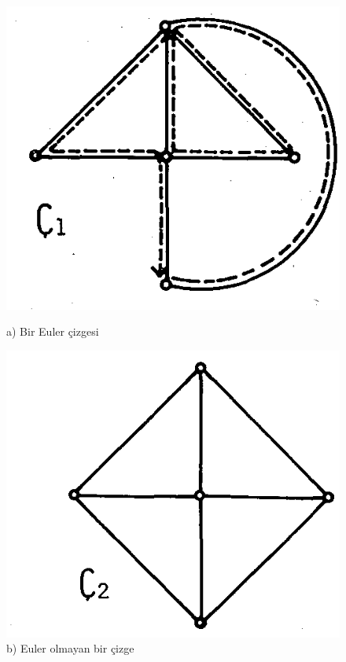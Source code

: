\documentclass{amsbook}
\begin{document}
    \begin{figure}[htbp]
      \centering
      \begin{minipage}{0.4\textwidth}
        \includegraphics[width=\textwidth]{images/ceyhun-079-fig01.png}
        \caption*{a) Bir Euler çizgesi}
      \end{minipage}
      \begin{minipage}{0.4\textwidth}
        \includegraphics[width=\textwidth]{images/ceyhun-079-fig02.png}
        \caption*{b) Euler olmayan bir çizge}
      \end{minipage}
    \end{figure}
    
\end{document}
